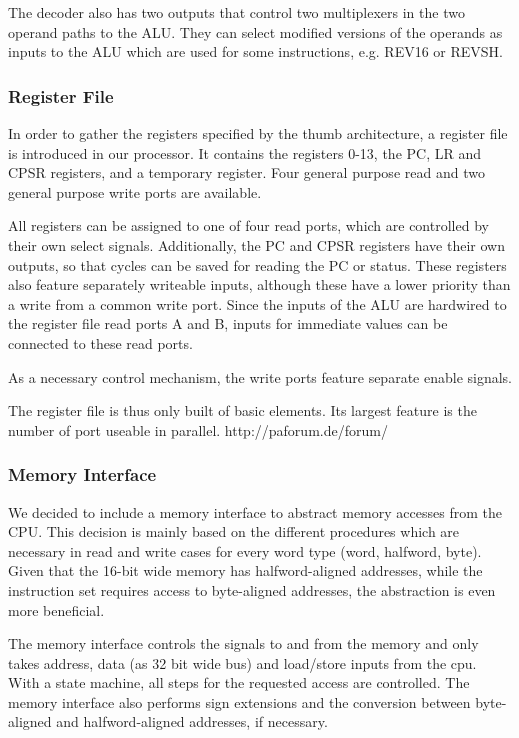 The decoder also has two outputs that control two multiplexers in the two operand paths to the ALU. They can select modified versions of the operands as inputs to the ALU which are used for some instructions, e.g. REV16 or REVSH.

\subsubsection{Register File}
\label{subsubsec:regfisterfile}
In order to gather the registers specified by the thumb architecture, a register file is introduced in our processor. It contains the registers 0-13, the PC, LR and CPSR registers, and a temporary register. Four general purpose read and two general purpose write ports are available.

All registers can be assigned to one of four read ports, which are controlled by their own select signals. Additionally, the PC and CPSR registers have their own outputs, so that cycles can be saved for reading the PC or status. These registers also feature separately writeable inputs, although these have a lower priority than a write from a common write port.
Since the inputs of the ALU are hardwired to the register file read ports A and B, inputs for immediate values can be connected to these read ports.

As a necessary control mechanism, the write ports feature separate enable signals.

The register file is thus only built of basic elements. Its largest feature is the number of port useable in parallel. 
http://paforum.de/forum/
\subsubsection{Memory Interface}
\label{subsubsec:memoryinterface}
We decided to include a memory interface to abstract memory accesses from the CPU. This decision is mainly based on the different procedures which are necessary in read and write cases for every word type (word, halfword, byte). Given that the 16-bit wide memory has halfword-aligned addresses, while the instruction set requires access to byte-aligned addresses, the abstraction is even more beneficial. 

The memory interface controls the signals to and from the memory and only takes address, data (as 32 bit wide bus) and load/store inputs from the cpu. With a state machine, all steps for the requested access are controlled. The memory interface also performs sign extensions and the conversion between byte-aligned and halfword-aligned addresses, if necessary.

